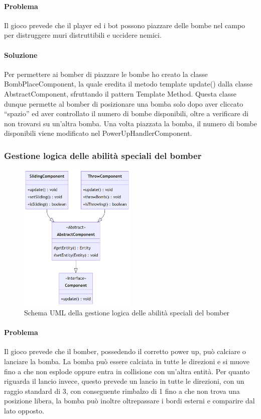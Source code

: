 \documentclass[a4paper,12pt]{report}
\begin{document}
\paragraph{Problema} Il gioco prevede che il player ed i bot possono piazzare delle bombe nel campo per distruggere muri distruttibili e uccidere nemici.

\paragraph{Soluzione} Per permettere ai bomber di piazzare le bombe ho creato la classe BombPlaceComponent, la quale eredita il metodo template update() dalla classe AbstractComponent, sfruttando il pattern Template Method. Questa classe dunque permette al bomber di posizionare una bomba solo dopo aver cliccato “spazio” ed aver controllato il numero di bombe disponibili, oltre a verificare di non trovarsi su un’altra bomba. Una volta piazzata la bomba, il numero di bombe disponibili viene modificato nel PowerUpHandlerComponent.


\subsubsection{Gestione logica delle abilità speciali del bomber}

\begin{figure}[H]
    \centering{}
    \includegraphics[width=0.5\textwidth]{img/UMLKickThrowBomb.png}
    \caption{Schema UML della gestione logica delle abilità speciali del bomber}
\end{figure}

\paragraph{Problema}  Il gioco prevede che il bomber, possedendo il corretto power up, può calciare o lanciare la bomba. La bomba può essere calciata in tutte le direzioni e si muove fino a che non esplode oppure entra in collisione con un’altra entità. Per quanto riguarda il lancio invece, questo prevede un lancio in tutte le direzioni, con un raggio standard di 3, con conseguente rimbalzo di 1 fino a che non trova una posizione libera, la bomba può inoltre oltrepassare i bordi esterni e comparire dal lato opposto.
\end{document}
